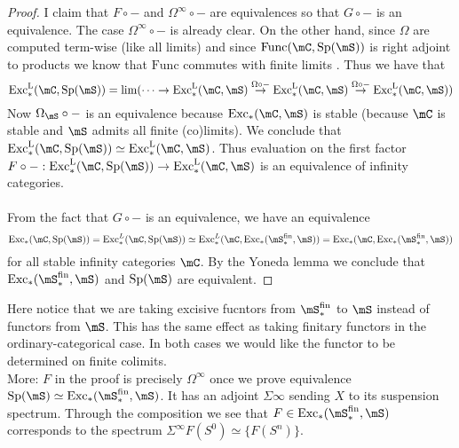 \documentclass[a4paper]{article}
\begin{document}
\begin{thm}{}{}
\begin{proof}
I claim that $F\circ -$ and $\Omega^\infty\circ -$ are equivalences so that $G\circ -$ is an equivalence. The case $\Omega^\infty\circ -$ is already clear. On the other hand, since $\Omega$ are computed term-wise (like all limits) and since $\text{Func}(\mC,\text{Sp}(\mS))$ is right adjoint to products we know that $\text{Func}$ commutes with finite limits . Thus we have that $$\text{Exc}_\ast^\text{L}(\mC,\text{Sp}(\mS))=\lim(\cdots\rightarrow\text{Exc}_\ast^{\text{L}}(\mC,\mS)\overset{\Omega\circ-}{\rightarrow}\text{Exc}_\ast^{\text{L}}(\mC,\mS)\overset{\Omega\circ-}{\rightarrow}\text{Exc}_\ast^{\text{L}}(\mC,\mS))$$ Now $\Omega_\mS\circ -$ is an equivalence because $\text{Exc}_\ast(\mC,\mS)$ is stable (because $\mC$ is stable and $\mS$ admits all finite (co)limits). We conclude that $\text{Exc}_\ast^{\text{L}}(\mC,\text{Sp}(\mS))\simeq\text{Exc}_\ast^{\text{L}}(\mC,\mS)$. Thus evaluation on the first factor $F\circ -:\text{Exc}_\ast^{\text{L}}(\mC,\text{Sp}(\mS))\to\text{Exc}_\ast^{\text{L}}(\mC,\mS)$ is an equivalence of infinity categories. \\~\\

From the fact that $G\circ -$ is an equivalence, we have an equivalence $$\text{Exc}_\ast(\mC,\text{Sp}(\mS))=\text{Exc}_\ast^L(\mC,\text{Sp}(\mS))\simeq\text{Exc}_\ast^L(\mC,\text{Exc}_\ast(\mS_\ast^\text{fin},\mS))=\text{Exc}_\ast(\mC,\text{Exc}_\ast(\mS_\ast^\text{fin},\mS))$$ for all stable infinity categories $\mC$. By the Yoneda lemma we conclude that $\text{Exc}_\ast(\mS_\ast^\text{fin},\mS)$ and $\text{Sp}(\mS)$ are equivalent. 
\end{proof}
\end{thm}

Here notice that we are taking excisive fucntors from $\mS_\ast^\text{fin}$ to $\mS$ instead of functors from $\mS$. This has the same effect as taking finitary functors in the ordinary-categorical case. In both cases we would like the functor to be determined on finite colimits. \\

More: $F$ in the proof is precisely $\Omega^\infty$ once we prove equivalence $\text{Sp}(\mS)\simeq\text{Exc}_\ast(\mS_\ast^\text{fin},\mS)$. It has an adjoint $\Sigma\infty$ sending $X$ to its suspension spectrum. Through the composition we see that $F\in\text{Exc}_\ast(\mS_\ast^\text{fin},\mS)$ corresponds to the spectrum $\Sigma^\infty F(S^0)\simeq\{F(S^n)\}$. 

\pagebreak
\end{document}
